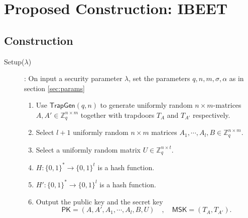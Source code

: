 \documentclass[runningheads]{llncs}
\def\ZZ{\mathbb{Z}}
\def\TrapGen{\mathsf{TrapGen}}
\def\PK{\mathsf{PK}}
\def\MSK{\mathsf{MSK}}
\begin{document}
	\section{Proposed Construction: IBEET}
	\subsection{Construction}
	\begin{description}
		\item[Setup($\lambda$)]: On input a security parameter $\lambda$, set the parameters $q,n,m,\sigma,\alpha$ as in section \ref{sec:params}
		\begin{enumerate}
			\item Use $\TrapGen(q,n)$ to generate uniformly random $n\times m$-matrices $A, A'\in\ZZ_q^{n\times m}$ together with trapdoors $T_{A}$ and $T_{A'}$ respectively.
			\item Select $l+1$ uniformly random $n\times m$ matrices $A_1,\cdots,A_l,B\in\ZZ_q^{n\times m}$.
			\item Select a uniformly random matrix $U\in\ZZ_q^{n\times t}$.
			\item $H: \{0,1\}^*\to \{0,1\}^t$ is a hash function.
		        \item $H': \{0,1\}^*\to \{0,1\}^l$ is a hash function.
			\item Output the public key and the secret key
			$$\PK=(A,A',A_1,\cdots,A_l,B,U)\quad,\quad \MSK=(T_A,T_{A'}).$$
		\end{enumerate} 
		

\end{description}
\end{document}
